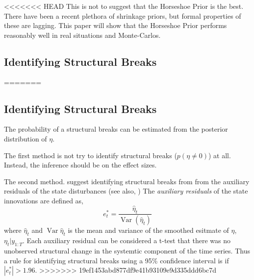 \documentclass{article}
\DeclareMathOperator{\Var}{Var}
\begin{document}

<<<<<<< HEAD
This is not to suggest that the Horseshoe Prior is the best. 
There have been a recent plethora of shrinkage priors, but formal properties of these are lagging.
This paper will show that the Horseshoe Prior performs reasonably well in real situations and Monte-Carlos.

\subsection{Identifying Structural Breaks}
=======
\subsection{Identifying Structural Breaks}

The probability of a structural breaks can be estimated from the posterior distribution of $\eta$.

The first method is not try to identify structural breaks ($p(\eta \neq 0)$) at all.
Instead, the inference should be on the effect sizes.

The second method.
\textcite{DurbinKoopman2012} suggest identifying structural breaks from from the auxiliary residuals of the state disturbances (see also, \textcite{JongPenzer1998})
The \textit{auxiliary residuals} of the state innovations are defined as,
\begin{equation}
  \label{eq:12}
  e^{*}_{t} = \frac{\hat \eta_{t}}{\Var (\hat \eta_{t})}
\end{equation}
where $\hat \eta_{t}$ and $\Var \hat \eta_{t}$ is the mean and variance of the smoothed esitmate of $\eta$, $\eta_{t} | y_{1:T}$.
Each auxiliary residual can be considered a t-test that there was no unobserved structural change in the systemtic component of the time series.
Thus a rule for identifying structural breaks using a 95\% confidence interval is if $|e^{*}_{t}| > 1.96$.
>>>>>>> 19ef1453abd877df9e41b93109e9d335ddd6bc7d
\end{document}
